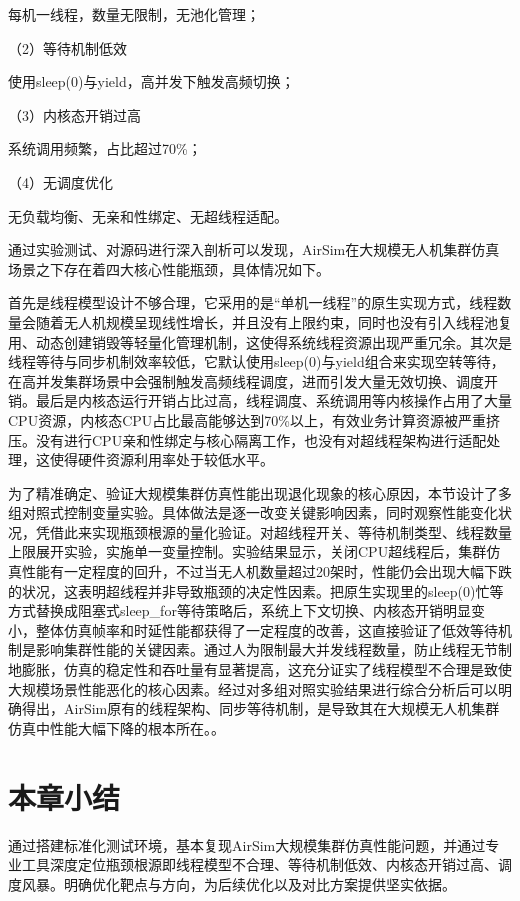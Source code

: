 每机一线程，数量无限制，无池化管理；

（2）等待机制低效

使用sleep(0)与yield，高并发下触发高频切换；

（3）内核态开销过高

系统调用频繁，占比超过70\%；

（4）无调度优化

无负载均衡、无亲和性绑定、无超线程适配。

通过实验测试、对源码进行深入剖析可以发现，AirSim在大规模无人机集群仿真场景之下存在着四大核心性能瓶颈，具体情况如下。

首先是线程模型设计不够合理，它采用的是``单机一线程''的原生实现方式，线程数量会随着无人机规模呈现线性增长，并且没有上限约束，同时也没有引入线程池复用、动态创建销毁等轻量化管理机制，这使得系统线程资源出现严重冗余。其次是线程等待与同步机制效率较低，它默认使用sleep(0)与yield组合来实现空转等待，在高并发集群场景中会强制触发高频线程调度，进而引发大量无效切换、调度开销。最后是内核态运行开销占比过高，线程调度、系统调用等内核操作占用了大量CPU资源，内核态CPU占比最高能够达到70\%以上，有效业务计算资源被严重挤压。没有进行CPU亲和性绑定与核心隔离工作，也没有对超线程架构进行适配处理，这使得硬件资源利用率处于较低水平。

为了精准确定、验证大规模集群仿真性能出现退化现象的核心原因，本节设计了多组对照式控制变量实验。具体做法是逐一改变关键影响因素，同时观察性能变化状况，凭借此来实现瓶颈根源的量化验证。对超线程开关、等待机制类型、线程数量上限展开实验，实施单一变量控制。实验结果显示，关闭CPU超线程后，集群仿真性能有一定程度的回升，不过当无人机数量超过20架时，性能仍会出现大幅下跌的状况，这表明超线程并非导致瓶颈的决定性因素。把原生实现里的sleep(0)忙等方式替换成阻塞式sleep\_for等待策略后，系统上下文切换、内核态开销明显变小，整体仿真帧率和时延性能都获得了一定程度的改善，这直接验证了低效等待机制是影响集群性能的关键因素。通过人为限制最大并发线程数量，防止线程无节制地膨胀，仿真的稳定性和吞吐量有显著提高，这充分证实了线程模型不合理是致使大规模场景性能恶化的核心因素。经过对多组对照实验结果进行综合分析后可以明确得出，AirSim原有的线程架构、同步等待机制，是导致其在大规模无人机集群仿真中性能大幅下降的根本所在。。

\section{本章小结}

通过搭建标准化测试环境，基本复现AirSim大规模集群仿真性能问题，并通过专业工具深度定位瓶颈根源即线程模型不合理、等待机制低效、内核态开销过高、调度风暴。明确优化靶点与方向，为后续优化以及对比方案提供坚实依据。
